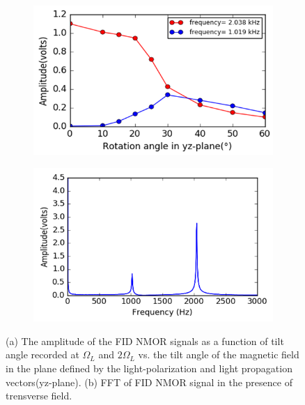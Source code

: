 \begin{figure}
    \centering
   \begin{subfigure}[b]{0.45\textwidth}
        \centering
        \includegraphics[width=\textwidth]{figures/amp_tiltangle}
        \caption{}
        \label{fig:y equals x}
    \end{subfigure}
    \hfill
     \begin{subfigure}[b]{0.45\textwidth}
        \centering
        \includegraphics[width=\textwidth]{figures/tansverse_field_fft}
        \caption{}
        \label{fig:three sin x}
    \end{subfigure}
    \caption{(a) The amplitude of the FID NMOR signals as a function of tilt angle recorded at $\Omega_L$ and $2\Omega_L$ vs. the tilt angle of the magnetic field in the plane defined by the light-polarization and light propagation vectors(yz-plane). (b) FFT of FID NMOR signal in the presence of trensverse field.}
\end{figure}

